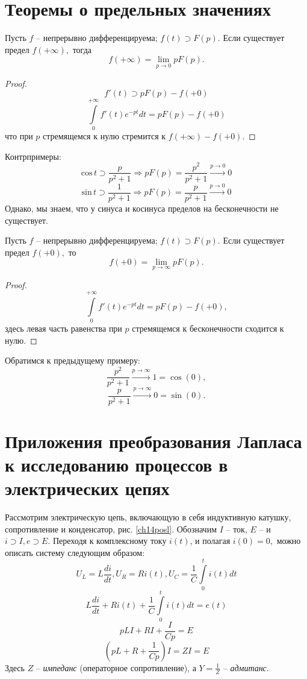 \section{Теоремы о предельных значениях}

\begin{theorem}

Пусть $f$ -- непрерывно дифференцируема; $f(t) \supset F(p).$ Если существует предел $f(+\infty),$ тогда
$$
f(+\infty) = \lim\limits_{p \rightarrow 0} p F(p).
$$
\end{theorem}
\begin{proof}
$$ f'(t) \supset pF(p) - f(+0) $$
$$ \int\limits_0^{+\infty} f'(t) e^{-pt} dt = p F(p) - f(+0) $$
что при $p$ стремящемся к нулю стремится к $f(+\infty) - f(+0).$ \end{proof}

Контрпримеры: 
$$ \text{cos} \, t \supset \frac{p}{p^2 +1} \Rightarrow pF(p) = \frac{p^2}{p^2 +1}  \stackrel{p \rightarrow 0}{\longrightarrow} 0   $$
$$ \text{sin} \, t \supset \frac{1}{p^2 +1} \Rightarrow pF(p) = \frac{p}{p^2 +1}  \stackrel{p \rightarrow 0}{\longrightarrow} 0$$
Однако, мы знаем, что у синуса и косинуса пределов на бесконечности не существует.

\begin{theorem}
Пусть $f$ -- непрерывно дифференцируема; $f(t) \supset F(p).$ Если существует предел $f(+0),$ то 
$$
f(+0) = \lim\limits_{p \rightarrow \infty} p F(p).
$$
\end{theorem}
\begin{proof}
$$ \int\limits_0^{+\infty} f'(t) e^{-pt} dt = p F(p) - f(+0), $$
здесь левая часть равенства при $p$ стремящемся к бесконечности сходится к нулю. \end{proof}

Обратимся к предыдущему примеру:
$$ \frac{p^2}{p^2 +1}  \stackrel{p \rightarrow \infty }{\longrightarrow} 1 = \cos(0), $$
$$ \frac{p}{p^2 +1}  \stackrel{p \rightarrow \infty }{\longrightarrow} 0 = \sin(0).$$

\section{Приложения преобразования Лапласа к исследованию процессов в электрических цепях}

Рассмотрим электрическую цепь, включающую в себя индуктивную катушку, сопротивление и конденсатор, рис. \ref{ch14posl}. Обозначим $I$ -- ток, $E$ -- и $i \supset I, e \supset E.$ Переходя к комплексному току $i(t)$, и полагая $i(0) = 0,$ можно описать систему следующим образом:
$$ U_L = L \frac{di}{dt}, U_R = Ri(t), U_C = \frac{1}{C} \int\limits_{0}^{t} i(t)dt$$
$$  L  \frac{di}{dt} + Ri(t) + \frac{1}{C} \int\limits_{0}^{t} i(t)dt = e(t)$$
$$p L I + R I + \frac{I}{Cp} = E$$
$$(p L + R + \frac{1}{C p})I = Z I = E $$
Здесь $Z$ -- \textit{импеданс} (операторное сопротивление), а $Y =\frac{1}{Z}$ -- \textit{адмитанс}.

